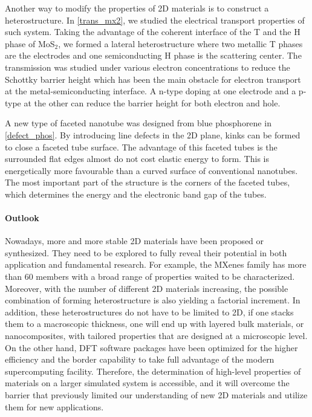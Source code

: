 Another way to modify the properties of 2D materials is to construct a heterostructure. In \autoref{trans_mx2}, we studied the electrical transport properties of such system. Taking the advantage of the coherent interface of the T and the H phase of MoS$_2$, we formed a lateral heterostructure where two metallic T phases are the electrodes and one semiconducting H phase is the scattering center. The transmission was studied under various electron concentrations to reduce the Schottky barrier height which has been the main obstacle for electron transport at the metal-semiconducting interface. A n-type doping at one electrode and a p-type at the other can reduce the barrier height for both electron and hole. 

A new type of faceted nanotube was designed from blue phosphorene in \autoref{defect_phos}. By introducing line defects in the 2D plane, kinks can be formed to close a faceted tube surface. The advantage of this faceted tubes is the surrounded flat edges almost do not cost elastic energy to form. This is energetically more favourable than a curved surface of conventional nanotubes. The most important part of the structure is the corners of the faceted tubes, which determines the energy and the electronic band gap of the tubes.

\paragraph{Outlook} Nowadays, more and more stable 2D materials have been proposed or synthesized. They need to be explored to fully reveal their potential in both application and fundamental research. For example, the MXenes family has more than 60 members with a broad range of properties waited to be characterized. Moreover, with the number of different 2D materials increasing, the possible combination of forming heterostructure is also yielding a factorial increment. In addition, these heterostructures do not have to be limited to 2D, if one stacks them to a macroscopic thickness, one will end up with layered bulk materials, or nanocomposites, with tailored properties that are designed at a microscopic level. On the other hand, DFT software packages have been optimized for the higher efficiency and the border capability to take full advantage of the modern supercomputing facility. Therefore, the determination of high-level properties of materials on a larger simulated system is accessible, and it will overcome the barrier that previously limited our understanding of new 2D materials and utilize them for new applications.